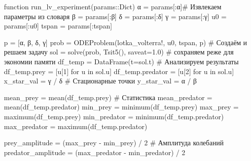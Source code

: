 \documentclass[
  12pt,
  a4paper,
  DIV=11,
  numbers=noendperiod]{scrreprt}
\newenvironment{Shaded}{\begin{snugshade}}{\end{snugshade}}
\newcommand{\CommentTok}[1]{\textcolor[rgb]{0.37,0.37,0.37}{#1}}
\newcommand{\DataTypeTok}[1]{\textcolor[rgb]{0.68,0.00,0.00}{#1}}
\newcommand{\FloatTok}[1]{\textcolor[rgb]{0.68,0.00,0.00}{#1}}
\newcommand{\FunctionTok}[1]{\textcolor[rgb]{0.28,0.35,0.67}{#1}}
\newcommand{\KeywordTok}[1]{\textcolor[rgb]{0.00,0.23,0.31}{#1}}
\newcommand{\NormalTok}[1]{\textcolor[rgb]{0.00,0.23,0.31}{#1}}
\newcommand{\OperatorTok}[1]{\textcolor[rgb]{0.37,0.37,0.37}{#1}}
\begin{document}
\begin{Shaded}
\begin{Highlighting}[]
\KeywordTok{function} \FunctionTok{run\_lv\_experiment}\NormalTok{(params}\OperatorTok{::}\DataTypeTok{Dict}\NormalTok{)}
\NormalTok{    α }\OperatorTok{=}\NormalTok{ params[}\OperatorTok{:}\NormalTok{α]}\CommentTok{\# Извлекаем параметры из словаря}
\NormalTok{    β }\OperatorTok{=}\NormalTok{ params[}\OperatorTok{:}\NormalTok{β]}
\NormalTok{    δ }\OperatorTok{=}\NormalTok{ params[}\OperatorTok{:}\NormalTok{δ]}
\NormalTok{    γ }\OperatorTok{=}\NormalTok{ params[}\OperatorTok{:}\NormalTok{γ]}
\NormalTok{    u0 }\OperatorTok{=}\NormalTok{ params[}\OperatorTok{:}\NormalTok{u0]}
\NormalTok{    tspan }\OperatorTok{=}\NormalTok{ params[}\OperatorTok{:}\NormalTok{tspan]}

\NormalTok{    p }\OperatorTok{=}\NormalTok{ [α, β, δ, γ]}
\NormalTok{    prob }\OperatorTok{=} \FunctionTok{ODEProblem}\NormalTok{(lotka\_volterra!, u0, tspan, p) }\CommentTok{\# Создаём и решаем задачу}
\NormalTok{    sol }\OperatorTok{=} \FunctionTok{solve}\NormalTok{(prob, }\FunctionTok{Tsit5}\NormalTok{(), saveat}\OperatorTok{=}\FloatTok{1.0}\NormalTok{)  }\CommentTok{\# сохраняем реже для экономии памяти}
\NormalTok{    df\_temp }\OperatorTok{=} \FunctionTok{DataFrame}\NormalTok{(t}\OperatorTok{=}\NormalTok{sol.t) }\CommentTok{\# Анализируем результаты}
\NormalTok{    df\_temp.prey }\OperatorTok{=}\NormalTok{ [u[}\FloatTok{1}\NormalTok{] for u }\KeywordTok{in}\NormalTok{ sol.u]}
\NormalTok{    df\_temp.predator }\OperatorTok{=}\NormalTok{ [u[}\FloatTok{2}\NormalTok{] for u }\KeywordTok{in}\NormalTok{ sol.u]}
\NormalTok{    x\_star\_val }\OperatorTok{=}\NormalTok{ γ }\OperatorTok{/}\NormalTok{ δ }\CommentTok{\# Стационарные точки}
\NormalTok{    y\_star\_val }\OperatorTok{=}\NormalTok{ α }\OperatorTok{/}\NormalTok{ β}

\NormalTok{    mean\_prey }\OperatorTok{=} \FunctionTok{mean}\NormalTok{(df\_temp.prey) }\CommentTok{\# Статистика}
\NormalTok{    mean\_predator }\OperatorTok{=} \FunctionTok{mean}\NormalTok{(df\_temp.predator)}
\NormalTok{    min\_prey }\OperatorTok{=} \FunctionTok{minimum}\NormalTok{(df\_temp.prey)}
\NormalTok{    max\_prey }\OperatorTok{=} \FunctionTok{maximum}\NormalTok{(df\_temp.prey)}
\NormalTok{    min\_predator }\OperatorTok{=} \FunctionTok{minimum}\NormalTok{(df\_temp.predator)}
\NormalTok{    max\_predator }\OperatorTok{=} \FunctionTok{maximum}\NormalTok{(df\_temp.predator)}

\NormalTok{    prey\_amplitude }\OperatorTok{=}\NormalTok{ (max\_prey }\OperatorTok{{-}}\NormalTok{ min\_prey) }\OperatorTok{/} \FloatTok{2} \CommentTok{\# Амплитуда колебаний}
\NormalTok{    predator\_amplitude }\OperatorTok{=}\NormalTok{ (max\_predator }\OperatorTok{{-}}\NormalTok{ min\_predator) }\OperatorTok{/} \FloatTok{2}


\end{Highlighting}
\end{Shaded}
\end{document}
